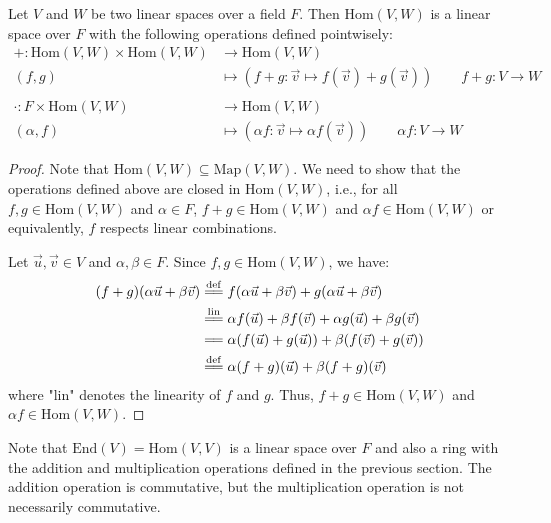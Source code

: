\documentclass[
	11pt, %
	fleqn, %
	a4paper, %
]{LegrandOrangeBook}
\newcommand{\End}[1]{\text{End}(#1)} %
\newcommand{\Hom}[2]{\text{Hom}(#1, #2)} %
\begin{document}
\begin{proposition}
    Let $V$ and $W$ be two linear spaces over a field $F$. Then $\Hom{V}{W}$ is a linear space over $F$ with the following operations defined pointwisely:
    \[
        \begin{split}
            + : \Hom{V}{W} \times \Hom{V}{W} &\to \Hom{V}{W} \\
            (f,g) &\mapsto (f+g: \vec{v} \mapsto f(\vec{v}) + g(\vec{v})) \qquad f + g : V \to W \\ \\
            \cdot : F \times \Hom{V}{W} &\to \Hom{V}{W} \\
            (\alpha,f) &\mapsto (\alpha f: \vec{v} \mapsto \alpha f(\vec{v})) \qquad \alpha f : V \to W
        \end{split}
    \]
\end{proposition}

\begin{proof}
    Note that $\Hom{V}{W} \subseteq \text{Map}(V, W)$. We need to show that the operations defined above are closed in $\Hom{V}{W}$, i.e., for all $f, g \in \Hom{V}{W}$ and $\alpha \in F$, $f + g \in \Hom{V}{W}$ and $\alpha f \in \Hom{V}{W}$ or equivalently, $f$ respects linear combinations.

    Let $\vec{u}, \vec{v} \in V$ and $\alpha, \beta \in F$. Since $f, g \in \Hom{V}{W}$, we have:
    \[
        \begin{split}
            (f + g)(\alpha\vec{u} + \beta\vec{v}) &\overset{\mathrm{def}}{=\joinrel=} f(\alpha\vec{u} + \beta\vec{v}) + g(\alpha\vec{u} + \beta\vec{v}) \\
            &\overset{\mathrm{lin}}{=\joinrel=} \alpha f(\vec{u}) + \beta f(\vec{v}) + \alpha g(\vec{u}) + \beta g(\vec{v}) \\
            &=\joinrel= \alpha (f(\vec{u}) + g(\vec{u})) + \beta (f(\vec{v}) + g(\vec{v})) \\
            &\overset{\mathrm{def}}{=\joinrel=} \alpha (f + g)(\vec{u}) + \beta (f + g)(\vec{v})
        \end{split}
    \]
    where "lin" denotes the linearity of $f$ and $g$. Thus, $f + g \in \Hom{V}{W}$ and $\alpha f \in \Hom{V}{W}$.
\end{proof}

\begin{remark}
    Note that $\End{V} = \Hom{V}{V}$ is a linear space over $F$ and also a ring with the addition and multiplication operations defined in the previous section. The addition operation is commutative, but the multiplication operation is not necessarily commutative.
\end{remark}
\end{document}
